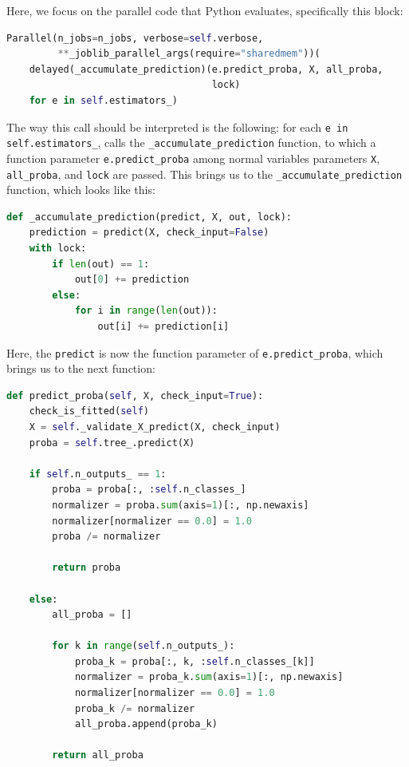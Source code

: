 \documentclass{IEEEtran}
\begin{document}
Here, we focus on the parallel code that Python evaluates, specifically this block:

\begin{lstlisting}[language=Python]
Parallel(n_jobs=n_jobs, verbose=self.verbose,
         **_joblib_parallel_args(require="sharedmem"))(
    delayed(_accumulate_prediction)(e.predict_proba, X, all_proba,
                                    lock)
    for e in self.estimators_)
\end{lstlisting}

The way this call should be interpreted is the following: for each \verb|e in self.estimators_|, calls the \verb|_accumulate_prediction| function, to which a function parameter \verb|e.predict_proba| among normal variables parameters \verb|X|, \verb|all_proba|, and \verb|lock| are passed. This brings us to the \verb|_accumulate_prediction| function, which looks like this:

\begin{lstlisting}[language=Python]
def _accumulate_prediction(predict, X, out, lock):
    prediction = predict(X, check_input=False)
    with lock:
        if len(out) == 1:
            out[0] += prediction
        else:
            for i in range(len(out)):
                out[i] += prediction[i]
\end{lstlisting}

Here, the \verb|predict| is now the function parameter of \verb|e.predict_proba|, which brings us to the next function:

\begin{lstlisting}[language=Python]
def predict_proba(self, X, check_input=True):
    check_is_fitted(self)
    X = self._validate_X_predict(X, check_input)
    proba = self.tree_.predict(X)

    if self.n_outputs_ == 1:
        proba = proba[:, :self.n_classes_]
        normalizer = proba.sum(axis=1)[:, np.newaxis]
        normalizer[normalizer == 0.0] = 1.0
        proba /= normalizer

        return proba

    else:
        all_proba = []

        for k in range(self.n_outputs_):
            proba_k = proba[:, k, :self.n_classes_[k]]
            normalizer = proba_k.sum(axis=1)[:, np.newaxis]
            normalizer[normalizer == 0.0] = 1.0
            proba_k /= normalizer
            all_proba.append(proba_k)

        return all_proba
\end{lstlisting}
\end{document}
